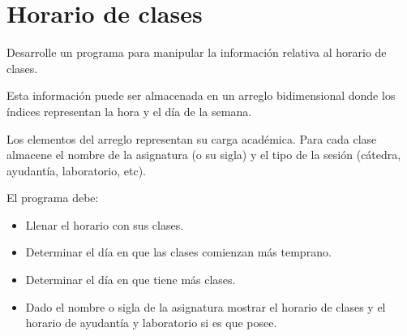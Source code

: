\section{Horario de clases}

Desarrolle un programa para manipular la información relativa al horario
de clases.

Esta información puede ser almacenada en un arreglo bidimensional donde
los índices representan la hora y el día de la semana.

Los elementos del arreglo representan su carga académica. Para cada
clase almacene el nombre de la asignatura (o su sigla) y el tipo de la
sesión (cátedra, ayudantía, laboratorio, etc).

El programa debe:

\begin{itemize}
\item
  Llenar el horario con sus clases.
\item
  Determinar el día en que las clases comienzan más temprano.
\item
  Determinar el día en que tiene más clases.
\item
  Dado el nombre o sigla de la asignatura mostrar el horario de clases y
  el horario de ayudantía y laboratorio si es que posee.
\end{itemize}
